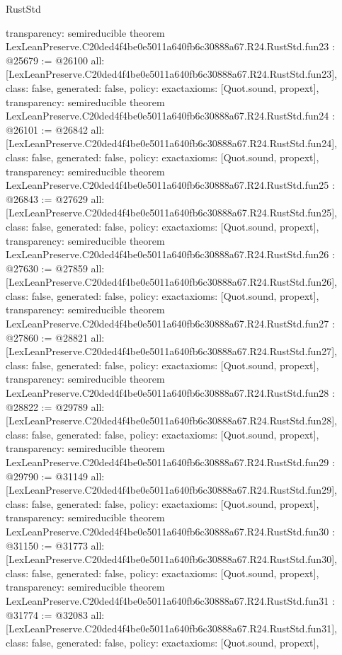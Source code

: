 \begin{lexlean}{RustStd}
\begin{coremodule}
{  transparency: semireducible
}
theorem LexLeanPreserve.C20ded4f4be0e5011a640fb6c30888a67.R24.RustStd.fun23 : @25679 := @26100 {
  all: [LexLeanPreserve.C20ded4f4be0e5011a640fb6c30888a67.R24.RustStd.fun23],
  class: false,
  generated: false,
  policy: exact{axioms: [Quot.sound, propext]},
  transparency: semireducible
}
theorem LexLeanPreserve.C20ded4f4be0e5011a640fb6c30888a67.R24.RustStd.fun24 : @26101 := @26842 {
  all: [LexLeanPreserve.C20ded4f4be0e5011a640fb6c30888a67.R24.RustStd.fun24],
  class: false,
  generated: false,
  policy: exact{axioms: [Quot.sound, propext]},
  transparency: semireducible
}
theorem LexLeanPreserve.C20ded4f4be0e5011a640fb6c30888a67.R24.RustStd.fun25 : @26843 := @27629 {
  all: [LexLeanPreserve.C20ded4f4be0e5011a640fb6c30888a67.R24.RustStd.fun25],
  class: false,
  generated: false,
  policy: exact{axioms: [Quot.sound, propext]},
  transparency: semireducible
}
theorem LexLeanPreserve.C20ded4f4be0e5011a640fb6c30888a67.R24.RustStd.fun26 : @27630 := @27859 {
  all: [LexLeanPreserve.C20ded4f4be0e5011a640fb6c30888a67.R24.RustStd.fun26],
  class: false,
  generated: false,
  policy: exact{axioms: [Quot.sound, propext]},
  transparency: semireducible
}
theorem LexLeanPreserve.C20ded4f4be0e5011a640fb6c30888a67.R24.RustStd.fun27 : @27860 := @28821 {
  all: [LexLeanPreserve.C20ded4f4be0e5011a640fb6c30888a67.R24.RustStd.fun27],
  class: false,
  generated: false,
  policy: exact{axioms: [Quot.sound, propext]},
  transparency: semireducible
}
theorem LexLeanPreserve.C20ded4f4be0e5011a640fb6c30888a67.R24.RustStd.fun28 : @28822 := @29789 {
  all: [LexLeanPreserve.C20ded4f4be0e5011a640fb6c30888a67.R24.RustStd.fun28],
  class: false,
  generated: false,
  policy: exact{axioms: [Quot.sound, propext]},
  transparency: semireducible
}
theorem LexLeanPreserve.C20ded4f4be0e5011a640fb6c30888a67.R24.RustStd.fun29 : @29790 := @31149 {
  all: [LexLeanPreserve.C20ded4f4be0e5011a640fb6c30888a67.R24.RustStd.fun29],
  class: false,
  generated: false,
  policy: exact{axioms: [Quot.sound, propext]},
  transparency: semireducible
}
theorem LexLeanPreserve.C20ded4f4be0e5011a640fb6c30888a67.R24.RustStd.fun30 : @31150 := @31773 {
  all: [LexLeanPreserve.C20ded4f4be0e5011a640fb6c30888a67.R24.RustStd.fun30],
  class: false,
  generated: false,
  policy: exact{axioms: [Quot.sound, propext]},
  transparency: semireducible
}
theorem LexLeanPreserve.C20ded4f4be0e5011a640fb6c30888a67.R24.RustStd.fun31 : @31774 := @32083 {
  all: [LexLeanPreserve.C20ded4f4be0e5011a640fb6c30888a67.R24.RustStd.fun31],
  class: false,
  generated: false,
  policy: exact{axioms: [Quot.sound, propext]},
}
\end{coremodule}
\end{lexlean}
